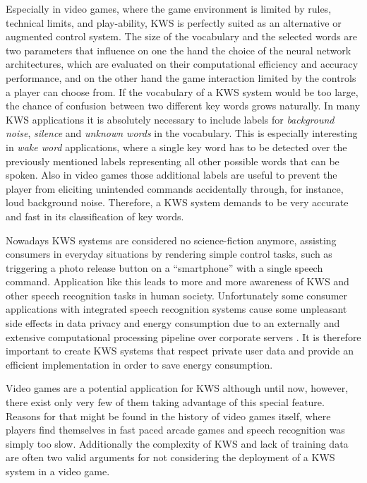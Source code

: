 Especially in video games, where the game environment is limited by rules, technical limits, and play-ability, KWS is perfectly suited as an alternative or augmented control system.
The size of the vocabulary and the selected words are two parameters that influence on one the hand the choice of the neural network architectures, which are evaluated on their computational efficiency and accuracy performance, and on the other hand the game interaction limited by the controls a player can choose from.
If the vocabulary of a KWS system would be too large, the chance of confusion between two different key words grows naturally.
In many KWS applications it is absolutely necessary to include labels for \emph{background noise}, \emph{silence} and \emph{unknown words} in the vocabulary. 
This is especially interesting in \emph{wake word} applications, where a single key word has to be detected over the previously mentioned labels representing all other possible words that can be spoken.
Also in video games those additional labels are useful to prevent the player from eliciting unintended commands accidentally through, for instance, loud background noise.
Therefore, a KWS system demands to be very accurate and fast in its classification of key words.

Nowadays KWS systems are considered no science-fiction anymore, assisting consumers in everyday situations by rendering simple control tasks, such as triggering a photo release button on a \enquote{smartphone} with a single speech command.
Application like this leads to more and more awareness of KWS and other speech recognition tasks in human society.
Unfortunately some consumer applications with integrated speech recognition systems cause some unpleasant side effects in data privacy and energy consumption due to an externally and extensive computational processing pipeline over corporate servers \cite{Tang2018}.
It is therefore important to create KWS systems that respect private user data and provide an efficient implementation in order to save energy consumption.

Video games are a potential application for KWS although until now, however, there exist only very few of them taking advantage of this special feature.
Reasons for that might be found in the history of video games itself, where players find themselves in fast paced arcade games and speech recognition was simply too slow.
Additionally the complexity of KWS and lack of training data are often two valid arguments for not considering the deployment of a KWS system in a video game.

